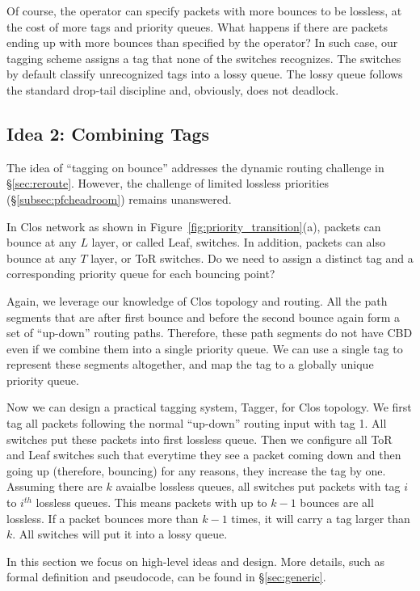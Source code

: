 Of course, the operator can specify packets with more bounces to be lossless, at
the cost of more tags and priority queues. What happens if there are 
packets ending up with more bounces than specified by the operator? In such case, 
our tagging scheme assigns a tag that none of the switches recognizes.  
The switches by default classify unrecognized tags into a lossy queue.
The lossy queue follows the standard drop-tail discipline and, obviously, does not deadlock. 


\subsection{Idea 2: Combining Tags}\label{subsec:combine}

The idea of ``tagging on bounce'' addresses the dynamic routing challenge 
in \S\ref{sec:reroute}. However, the challenge of limited lossless priorities 
(\S\ref{subsec:pfcheadroom}) remains unanswered.

In Clos network as shown in Figure~\ref{fig:priority_transition}(a), packets can 
bounce at any $L$ layer, or called Leaf, switches. In addition, packets can also 
bounce at any $T$ layer, or ToR switches. Do we need to assign a distinct tag and 
a corresponding priority queue for each bouncing point? 

Again, we leverage our knowledge of Clos topology and routing. All the path segments
that are after first bounce and before the second bounce again form a set of ``up-down''
routing paths. Therefore, these path segments do not have CBD even if we combine them
into a single priority queue. We can use a single tag to represent these segments
altogether, and map the tag to a globally unique priority queue.

Now we can design a practical tagging system, Tagger, for Clos topology. We first tag all packets 
following the normal ``up-down'' routing input with tag 1. All switches put these packets 
into first lossless queue. Then we configure all ToR and Leaf switches such that everytime
they see a packet coming down and then going up (therefore, bouncing) for any reasons, 
they increase the tag by one. Assuming there are $k$ avaialbe lossless queues, all switches 
put packets with tag $i$ to $i^{th}$ lossless queues. This means packets with up to $k-1$ 
bounces are all lossless. If a packet bounces more than $k-1$ times, it will carry a tag
larger than $k$. All switches will put it into a lossy queue.

In this section we focus on high-level ideas and design. More details, such as formal definition
and pseudocode, can be found in \S\ref{sec:generic}.

